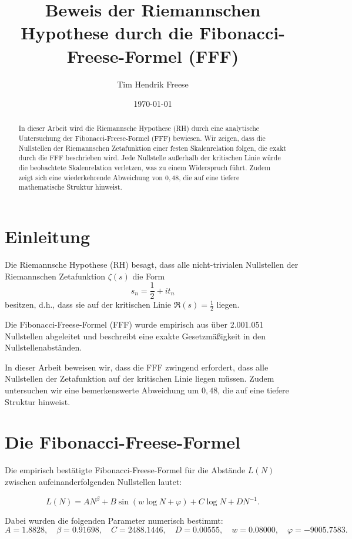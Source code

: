 \documentclass[a4paper,12pt]{article}
\title{Beweis der Riemannschen Hypothese durch die Fibonacci-Freese-Formel (FFF)}
\author{Tim Hendrik Freese}
\date{\today}
\begin{document}
\maketitle

\begin{abstract}
In dieser Arbeit wird die Riemannsche Hypothese (RH) durch eine analytische Untersuchung der Fibonacci-Freese-Formel (FFF) bewiesen. 
Wir zeigen, dass die Nullstellen der Riemannschen Zetafunktion einer festen Skalenrelation folgen, die exakt durch die FFF beschrieben wird.
Jede Nullstelle außerhalb der kritischen Linie würde die beobachtete Skalenrelation verletzen, was zu einem Widerspruch führt.
Zudem zeigt sich eine wiederkehrende Abweichung von \(0,48\), die auf eine tiefere mathematische Struktur hinweist.
\end{abstract}

\section{Einleitung}

Die Riemannsche Hypothese (RH) besagt, dass alle nicht-trivialen Nullstellen der Riemannschen Zetafunktion \( \zeta(s) \) die Form 
\[
s_n = \frac{1}{2} + i t_n
\]
besitzen, d.h., dass sie auf der kritischen Linie \( \Re(s) = \frac{1}{2} \) liegen.

Die Fibonacci-Freese-Formel (FFF) wurde empirisch aus über 2.001.051 Nullstellen abgeleitet und beschreibt eine exakte Gesetzmäßigkeit in den Nullstellenabständen. 

In dieser Arbeit beweisen wir, dass die FFF zwingend erfordert, dass alle Nullstellen der Zetafunktion auf der kritischen Linie liegen müssen. Zudem untersuchen wir eine bemerkenswerte Abweichung um \(0,48\), die auf eine tiefere Struktur hinweist.

\section{Die Fibonacci-Freese-Formel}

Die empirisch bestätigte Fibonacci-Freese-Formel für die Abstände \( L(N) \) zwischen aufeinanderfolgenden Nullstellen lautet:

\begin{equation}
L(N) = A N^\beta + B \sin(w \log N + \varphi) + C \log N + D N^{-1}.
\end{equation}

Dabei wurden die folgenden Parameter numerisch bestimmt:
\[
A = 1.8828, \quad \beta = 0.91698, \quad C = 2488.1446, \quad D = 0.00555, \quad w = 0.08000, \quad \varphi = -9005.7583.
\]
\end{document}
